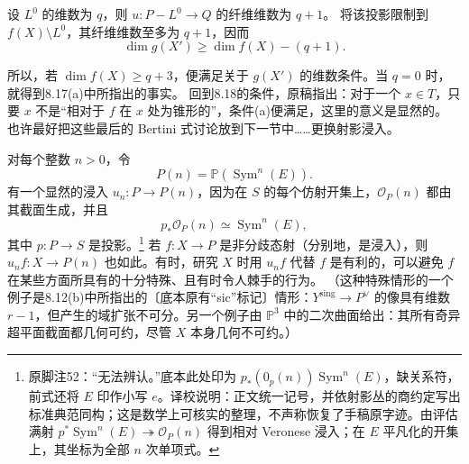 设 $L^0$ 的维数为 $q$，则 $u:P-L^0\to Q$ 的纤维维数为 $q+1$。
将该投影限制到 $f(X)\setminus L^0$，其纤维维数至多为 $q+1$，因而
\[
\dim g(X')\ge \dim f(X)-(q+1).
\]

所以，若 $\dim f(X)\ge q+3$，便满足关于 $g(X')$ 的维数条件。当 $q=0$ 时，就得到8.17(a)中所指出的事实。
回到8.18的条件，原稿指出：对于一个 $x\in T$，只要 $x$ 不是“相对于 $f$ 在 $x$ 处为锥形的”，条件(a)便满足，这里的意义是显然的。
也许最好把这些最后的 Bertini 式讨论放到下一节中……更换射影浸入。

对每个整数 $n>0$，令
\[
P(n)=\mathbb P(\operatorname{Sym}^{n}(E)).
\]
有一个显然的浸入 $u_n:P\to P(n)$，因为在 $S$ 的每个仿射开集上，$\mathcal O_P(n)$ 都由其截面生成，并且
\[
p_*\mathcal O_P(n)\simeq\operatorname{Sym}^{n}(E),
\]
其中 $p:P\to S$ 是投影。\footnote{原脚注52：“无法辨认。”底本此处印为 $p_*(0_p(n))\operatorname{Sym}^{n}(E)$，缺关系符，前式还将 $E$ 印作小写 $e$。译校说明：正文统一记号，并依射影丛的商约定写出标准典范同构；这是数学上可核实的整理，不声称恢复了手稿原字迹。由评估满射 $p^*\operatorname{Sym}^{n}(E)\twoheadrightarrow\mathcal O_P(n)$ 得到相对 Veronese 浸入；在 $E$ 平凡化的开集上，其坐标为全部 $n$ 次单项式。}
若 $f:X\to P$ 是非分歧态射（分别地，是浸入），则 $u_n f:X\to P(n)$ 也如此。有时，研究 $X$ 时用 $u_n f$ 代替 $f$ 是有利的，可以避免 $f$ 在某些方面所具有的十分特殊、且有时令人棘手的行为。
（这种特殊情形的一个例子是8.12(b)中所指出的〔底本原有“sic”标记〕情形：$Y^{\mathrm{sing}}\to P^\vee$ 的像具有维数 $r-1$，但产生的域扩张不可分。另一个例子由 $\mathbb P^3$ 中的二次曲面给出：其所有奇异超平面截面都几何可约，尽管 $X$ 本身几何不可约。）

